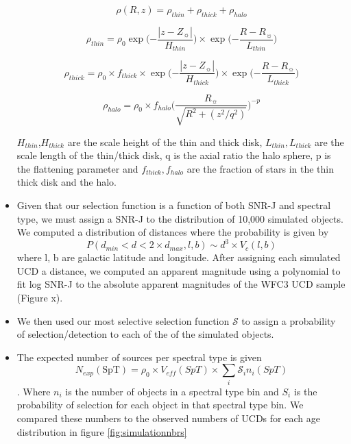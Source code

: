 \documentclass[manuscript]{aastex}
\begin{document}
\begin{itemize}
\begin{equation}
\rho (R, z)= \rho _{thin} + \rho_{thick} + \rho_{halo}
\end{equation}

\begin{equation}
 \rho _{thin}= \rho _0 \exp \biggl( {-\frac{|z-Z_\sun|}{H_{thin}}} \biggl) \times \exp \biggl( {-\frac{R-R_\sun}{L_{thin}}} \biggl)
\end{equation}

\begin{equation}
 \rho _{thick}= \rho _0 \times f_{thick}\times \exp \biggl( {-\frac{|z-Z_\sun|}{H_{thick}}} \biggl) \times \exp \biggl( {-\frac{R-R_\sun}{L_{thick}}} \biggl)
\end{equation}

\begin{equation}
 \rho _{halo}= \rho _0 \times    f _{halo} \biggl(\frac{R_\sun}{\sqrt{R^2+(z^2/q^2)}} \biggl)^{-p}
 \end{equation}
 

$H_{thin}$,$H_{thick}$ are the scale height of the thin and thick disk, $L_{thin}, L_{thick}$ are the scale length of the thin/thick disk, q is the axial ratio the halo sphere, p is the flattening parameter and $f _{thick}, f _{halo}$  are the fraction of stars in the thin thick disk and the halo.

\item Given that our selection function is a function of both SNR-J and spectral type, we must assign a SNR-J to the distribution of 10,000 simulated objects.  We computed a distribution of distances where the probability is given by \begin{equation} \label{eq:distancerandom} P(d_{min} < d < 2\times d_{max}, l, b) \sim d^3 \times V_c(l, b) \end{equation} where l, b are galactic latitude and longitude. After assigning each simulated UCD a distance, we computed an apparent magnitude using a  polynomial to fit log SNR-J to the absolute apparent magnitudes of the WFC3 UCD sample (Figure x).

\item  We then used our most selective selection function $\mathcal{S}$ to assign a probability of selection/detection to each of the of the simulated objects.

\item  The expected number of sources per spectral type is given
\begin{equation}
N_{exp}(\text{SpT})=\rho_0 \times V_{eff} (SpT) \times \sum_{i} \mathcal{S}_i n_i (SpT)
\end{equation}. Where $n_i$ is the number of objects in a spectral type bin and $S_i$ is the probability of selection for each object in that spectral type bin. We compared these numbers to the observed numbers of UCDs for each age distribution in figure \ref{fig:simulationnbrs}

\end{itemize}
\end{document}
